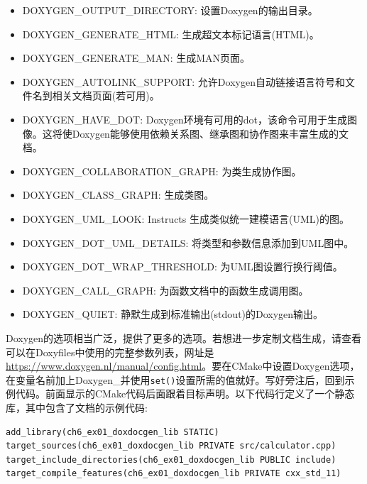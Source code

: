 \begin{itemize}
\item 
DOXYGEN\_OUTPUT\_DIRECTORY: 设置Doxygen的输出目录。

\item 
DOXYGEN\_GENERATE\_HTML: 生成超文本标记语言(HTML)。

\item 
DOXYGEN\_GENERATE\_MAN: 生成MAN页面。

\item 
DOXYGEN\_AUTOLINK\_SUPPORT: 允许Doxygen自动链接语言符号和文件名到相关文档页面(若可用)。

\item 
DOXYGEN\_HAVE\_DOT: Doxygen环境有可用的dot，该命令可用于生成图像。这将使Doxygen能够使用依赖关系图、继承图和协作图来丰富生成的文档。

\item 
DOXYGEN\_COLLABORATION\_GRAPH: 为类生成协作图。

\item 
DOXYGEN\_CLASS\_GRAPH: 生成类图。

\item 
DOXYGEN\_UML\_LOOK: Instructs 生成类似统一建模语言(UML)的图。

\item 
DOXYGEN\_DOT\_UML\_DETAILS: 将类型和参数信息添加到UML图中。

\item 
DOXYGEN\_DOT\_WRAP\_THRESHOLD: 为UML图设置行换行阈值。

\item 
DOXYGEN\_CALL\_GRAPH: 为函数文档中的函数生成调用图。

\item 
DOXYGEN\_QUIET: 静默生成到标准输出(stdout)的Doxygen输出。
\end{itemize}

Doxygen的选项相当广泛，提供了更多的选项。若想进一步定制文档生成，请查看可以在Doxyfiles中使用的完整参数列表，网址是\url{https://www.doxygen.nl/manual/config.html}。要在CMake中设置Doxygen选项，在变量名前加上Doxygen\_并使用\texttt{set()}设置所需的值就好。写好旁注后，回到示例代码。前面显示的CMake代码后面跟着目标声明。以下代码行定义了一个静态库，其中包含了文档的示例代码:

\begin{lstlisting}[style=styleCMake]
add_library(ch6_ex01_doxdocgen_lib STATIC)
target_sources(ch6_ex01_doxdocgen_lib PRIVATE src/calculator.cpp)
target_include_directories(ch6_ex01_doxdocgen_lib PUBLIC include)
target_compile_features(ch6_ex01_doxdocgen_lib PRIVATE cxx_std_11)
\end{lstlisting}

